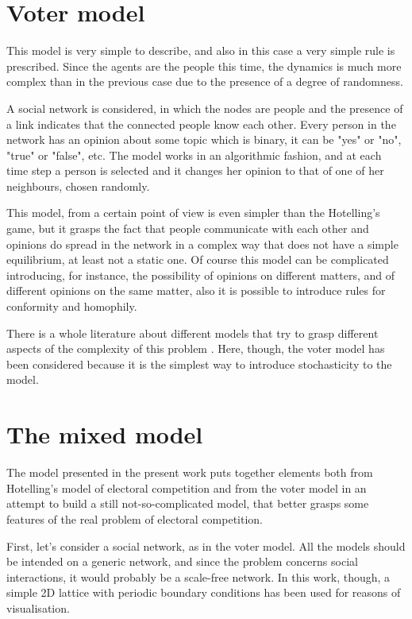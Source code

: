 \documentclass[11pt,a4paper,twocolumn]{article}
\begin{document}
\section{Voter model}
\vspace*{-0.2cm}
This model is very simple to describe, and also in this case a very simple rule is prescribed. Since the agents are the people this time, the dynamics is much more complex than in the previous case due to the presence of a degree of randomness. 

A social network is considered, in which the nodes are people and the presence of a link indicates that the connected people know each other. Every person in the network has an opinion about some topic which is binary, it can be "yes" or "no", "true" or "false", etc. The model works in an algorithmic fashion, and at each time step a person is selected and it changes her opinion to that of one of her neighbours, chosen randomly.

This model, from a certain point of view is even simpler than the Hotelling's game, but it grasps the fact that people communicate with each other and opinions do spread in the network in a complex way that does not have a simple equilibrium, at least not a static one.
Of course this model can be complicated introducing, for instance, the possibility of opinions on different matters, and of different opinions on the same matter, also it is possible to introduce rules for conformity and homophily.

There is a whole literature about different models that try to grasp different aspects of the complexity of this problem \cite{Galam2002,Nowak1990,Deffuant2000,Hegselmann2002}. Here, though, the voter model has been considered because it is the simplest way to introduce stochasticity to the model.

\section{The mixed model}
\vspace*{-0.2cm}
The model presented in the present work puts together elements both from Hotelling's model of electoral competition and from the voter model in an attempt to build a still not-so-complicated model, that better grasps some features of the real problem of electoral competition.

First, let's consider a social network, as in the voter model. All the models should be intended on a generic network, and since the problem concerns social interactions, it would probably be a scale-free network. In this work, though, a simple 2D lattice with periodic boundary conditions has been used for reasons of visualisation. 
\end{document}
